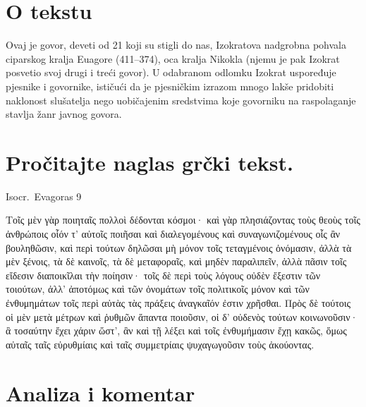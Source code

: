 

\section*{O tekstu}

Ovaj je govor, deveti od 21 koji su stigli do nas, Izokratova nadgrobna pohvala ciparskog kralja Euagore (411–374), oca kralja Nikokla (njemu je pak Izokrat posvetio svoj drugi i treći govor). U odabranom odlomku Izokrat uspoređuje pjesnike i govornike, ističući da je pjesničkim izrazom mnogo lakše pridobiti  naklonost slušatelja nego uobičajenim sredstvima koje govorniku na raspolaganje stavlja žanr javnog govora.


\section*{Pročitajte naglas grčki tekst.}


Isocr.\ Evagoras 9

\medskip

{\large
\begin{greek}
\noindent Τοῖς μὲν γὰρ ποιηταῖς πολλοὶ δέδονται κόσμοι· καὶ γὰρ πλησιάζοντας τοὺς θεοὺς τοῖς ἀνθρώποις οἷόν τ' αὐτοῖς ποιῆσαι καὶ διαλεγομένους καὶ συναγωνιζομένους οἷς ἂν βουληθῶσιν, καὶ περὶ τούτων δηλῶσαι μὴ μόνον τοῖς τεταγμένοις ὀνόμασιν, ἀλλὰ τὰ μὲν ξένοις, τὰ δὲ καινοῖς, τὰ δὲ μεταφοραῖς, καὶ μηδὲν παραλιπεῖν, ἀλλὰ πᾶσιν τοῖς εἴδεσιν διαποικῖλαι τὴν ποίησιν· τοῖς δὲ περὶ τοὺς λόγους οὐδὲν ἔξεστιν τῶν τοιούτων, ἀλλ' ἀποτόμως καὶ τῶν ὀνομάτων τοῖς πολιτικοῖς μόνον καὶ τῶν ἐνθυμημάτων τοῖς περὶ αὐτὰς τὰς πράξεις ἀναγκαῖόν ἐστιν χρῆσθαι. Πρὸς δὲ τούτοις οἱ μὲν μετὰ μέτρων καὶ ῥυθμῶν ἅπαντα ποιοῦσιν, οἱ δ' οὐδενὸς τούτων κοινωνοῦσιν· ἃ τοσαύτην ἔχει χάριν ὥστ', ἂν καὶ τῇ λέξει καὶ τοῖς ἐνθυμήμασιν ἔχῃ κακῶς, ὅμως αὐταῖς ταῖς εὐρυθμίαις καὶ ταῖς συμμετρίαις ψυχαγωγοῦσιν τοὺς ἀκούοντας.

\end{greek}

}

\section*{Analiza i komentar}

